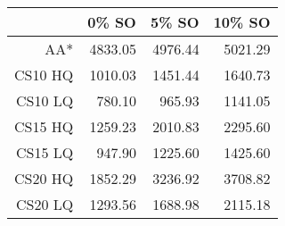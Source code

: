 \begin{table}[ht]
\begin{center}
\begin{tabular}{rrrr}
  \hline
 & 0\% SO & 5\% SO & 10\% SO \\
  \hline
AA* & 4833.05 & 4976.44 & 5021.29 \\
  CS10 HQ & 1010.03 & 1451.44 & 1640.73 \\
  CS10 LQ & 780.10 & 965.93 & 1141.05 \\
  CS15 HQ & 1259.23 & 2010.83 & 2295.60 \\
  CS15 LQ & 947.90 & 1225.60 & 1425.60 \\
  CS20 HQ & 1852.29 & 3236.92 & 3708.82 \\
  CS20 LQ & 1293.56 & 1688.98 & 2115.18 \\
   \hline
\end{tabular}
\end{center}
\end{table}
